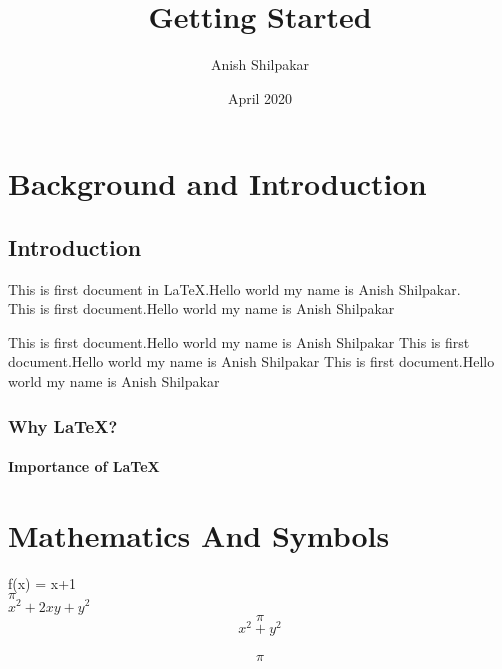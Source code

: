 \documentclass{report}%
\title{Getting Started}
\author{Anish Shilpakar}
\date{April 2020}
\begin{document}
\maketitle
\chapter{Background and Introduction}
\section{Introduction}
This is first document in \LaTeX .Hello world my name is Anish Shilpakar.\\
This is first document.Hello world my name is Anish Shilpakar

This is first document.Hello world my name is Anish Shilpakar
This is first document.Hello world my name is Anish Shilpakar
This is first document.Hello world my name is Anish Shilpakar

\subsection{Why \LaTeX ?}

\subsubsection{Importance of \LaTeX}

\chapter{Mathematics And Symbols}

f(x) = x+1\\
$\pi$\\ %
$x^2+2xy+y^2$
$$\pi$$  %
$$x^2+y^2$$\\$$\pi$$
\end{document}
